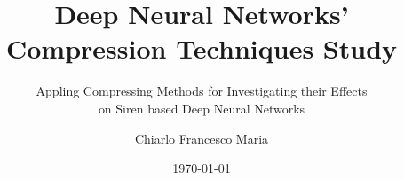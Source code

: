 



\title{Deep Neural Networks' Compression Techniques Study}
\subtitle{Appling Compressing Methods for Investigating their Effects\\on Siren based Deep Neural Networks}
\author{Chiarlo Francesco Maria}
\date{\today}
